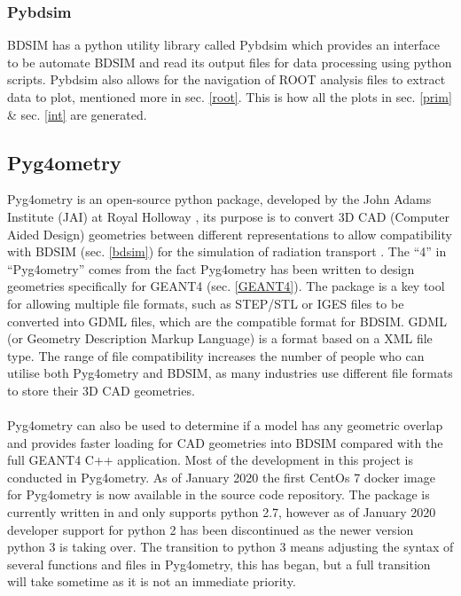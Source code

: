 \documentclass[12pt,a4paper]{article}
\begin{document}
\subsubsection{Pybdsim}
\label{pyb}
BDSIM has a python utility library called Pybdsim which provides an interface to be automate BDSIM and read its output files for data processing using python scripts. Pybdsim also allows for the navigation of ROOT analysis files to extract data to plot, mentioned more in sec. \ref{root}. This is how all the plots in sec. \ref{prim} \& sec. \ref{int} are generated.



\subsection{Pyg4ometry}
\label{pyg}
Pyg4ometry is an open-source python package, developed by the John Adams Institute (JAI) at Royal Holloway \cite{jai}, its purpose is to convert 3D CAD (Computer Aided Design) geometries between different representations to allow compatibility with BDSIM (sec. \ref{bdsim}) for the simulation of radiation transport \cite{pyg4om}. The ``4'' in ``Pyg4ometry'' comes from the fact Pyg4ometry has been written to design geometries specifically for GEANT4 (sec. \ref{GEANT4}). The package is a key tool for allowing multiple file formats, such as STEP/STL or IGES files to be converted into GDML files, which are the compatible format for BDSIM. GDML (or Geometry Description Markup Language) is a format based on a XML file type. The range of file compatibility increases the number of people who can utilise both Pyg4ometry and BDSIM, as many industries use different file formats to store their 3D CAD geometries.
\\\\
\noindent Pyg4ometry can also be used to determine if a model has any geometric overlap and provides faster loading for CAD geometries into BDSIM compared with the full GEANT4 C++ application. Most of the development in this project is conducted in Pyg4ometry. As of January 2020 the first CentOs 7 docker image for Pyg4ometry is now available in the source code repository. The package is currently written in and only supports python 2.7, however as of January 2020 developer support for python 2 has been discontinued as the newer version python 3 is taking over. The transition to python 3 means adjusting the syntax of several functions and files in Pyg4ometry, this has began, but a full transition will take sometime as it is not an immediate priority. 
\end{document}
